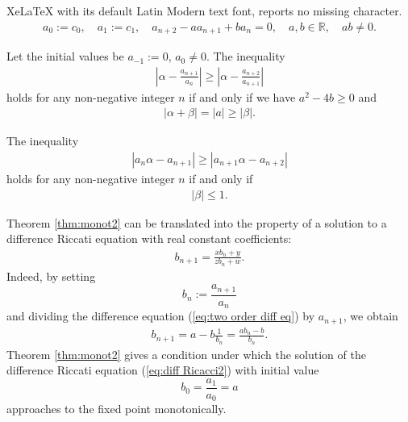 \documentclass[10pt,a4paper]{amsart}
\begin{document}
XeLaTeX with its default Latin Modern text font, reports no missing character.
\begin{align}
\label{eq:two order diff eq}
a_{0}:=c_{0}, \quad a_{1}:=c_{1}, \quad 
a_{n+2}-aa_{n+1}+ba_{n}=0, \quad a,b \in \mathbb{R}, \quad ab\not=0 .
\end{align}

\begin{thm}
\label{thm:monot2}
Let the initial values be $a_{-1}:=0$, $a_{0}\not=0$. 
The inequality 
\begin{align}
\label{eq:monot2-2}
\left|\alpha -\frac{a_{n+1}}{a_{n}}\right| \geq \left|\alpha -\frac{a_{n+2}}{a_{n+1}}\right|
\end{align}
holds for any non-negative integer $n$ if and only if
we have $a^{2}-4b \geq 0$ and 
\begin{align}
\label{eq:cond2}
|\alpha +\beta |=|a|\geq |\beta |.
\end{align}
\end{thm}

\begin{thm}
\label{thm:monot3}
The inequality 
\begin{align}
\label{eq:monot3}
\left|a_{n}\alpha -a_{n+1}\right| \geq \left|a_{n+1}\alpha -a_{n+2}\right|
\end{align}
holds for any non-negative integer $n$ if and only if
\begin{align}
\label{eq:cond3}
|\beta |\leq 1.
\end{align}
\end{thm}

\begin{rmk}
\label{rmk:Ricacci}
Theorem \ref{thm:monot2} can be translated into the property of 
a solution to a difference Riccati equation with real constant coefficients: 
\begin{align}
\label{eq:diff Ricacci1}
b_{n+1}=\frac{xb_{n}+y}{zb_{n}+w}.
\end{align}
Indeed, by setting 
$$
b_{n}:=\frac{a_{n+1}}{a_{n}} 
$$
and dividing the difference equation (\ref{eq:two order diff eq}) by $a_{n+1}$, we obtain 
\begin{align}
\label{eq:diff Ricacci2}
b_{n+1}=a-b\frac{1}{b_{n}}=\frac{ab_{n}-b}{b_{n}} .
\end{align}
Theorem \ref{thm:monot2} gives a condition under which 
the solution of the difference Riccati equation (\ref{eq:diff Ricacci2}) 
with initial value
$$
b_{0}=\frac{a_{1}}{a_{0}}=a
$$
approaches to the fixed point monotonically.  
\end{rmk}
\end{document}
